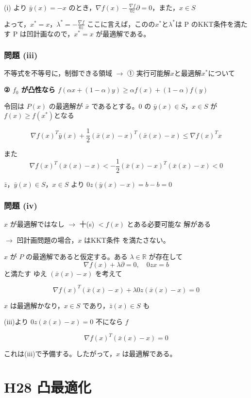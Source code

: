 \documentclass[12pt,a4paper]{article}
\begin{document}
(i) より $\bar{y}(x) = -x$ のとき，$\nabla f(x) - \frac{\nabla f}{0z} \partial = 0$，また，$x \in S$

よって，$x^* = x$，$\lambda^* = -\frac{\nabla f}{0z}$ ここに言えば，このの$x^*$と$\lambda^*$は P のKKT条件を満たす
P は凹計画なので，$x^* = x$ が最適解である。

\section*{問題 (iii)}

不等式を不等号に，制御できる領域 $\rightarrow$ ① 実行可能解$x$と最適解$x^*$について

\textbf{② $f_0$ が凸性なら $f(\alpha x + (1-\alpha)y) \geq \alpha f(x) + (1-\alpha)f(y)$}

令回は $P(x)$ の最適解が $\bar{x}$ であるとする。0 の 
$\bar{y}(x) \in S$，$x \in S$ が $f(x) \geq f(x^*)$となる

\[\nabla f(x)^T \bar{y}(x) + \frac{1}{2}(\bar{x}(x) - x)^T(\bar{x}(x) - x) \leq \nabla f(x)^T x\]

また \[\nabla f(x)^T(\bar{x}(x) - x) < -\frac{1}{2}(\bar{x}(x) - x)^T(\bar{x}(x) - x) < 0\]

$\bar{z}$，$\bar{y}(x) \in S$，$x \in S$ より $0z(\bar{y}(x) - x) = b - b = 0$

\section*{問題 (iv)}

$x$ が最適解ではなし $\rightarrow$ 十(s) $< f(x)$ とある必要可能な
解がある

$\rightarrow$ 凹計画問題の場合，$x$ はKKT条件
を満たさない。

$x$ が $P$ の最適解であると仮定する。ある $\lambda \in \mathbb{R}$ が存在して
\[\nabla f(x) + \lambda \partial = 0, \quad 0z x = b\]
と満たす ゆえ $(\bar{x}(x) - x)$ を考えて

\[\nabla f(x)^T(\bar{x}(x) - x) + \lambda 0z (\bar{x}(x) - x) = 0\]

$x$ は最適解かなり，$x \in S$ であり，$\bar{z}(x) \in S$ も

(iii)より $0z(\bar{x}(x) - x) = 0$ 不になら $f$

\[\nabla f(x)^T(\bar{x}(x) - x) = 0\]

これは(iii)で予備する。したがって，$x$ は最適解である。

\newpage

\part*{H28 凸最適化}
\end{document}

